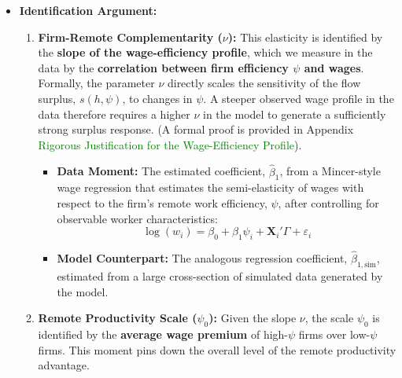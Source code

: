 \documentclass[
  11pt,
  letterpaper,
  DIV=11,
  numbers=noendperiod]{scrartcl}
\providecommand{\tightlist}{%
  \setlength{\itemsep}{0pt}\setlength{\parskip}{0pt}}\usepackage{longtable,booktabs,array}
\begin{document}
\begin{itemize}
\item
  \textbf{Identification Argument:}

  \begin{enumerate}
  \def\labelenumi{\arabic{enumi}.}
  \tightlist
  \item
    \textbf{Firm-Remote Complementarity (\(\nu\)):} This elasticity is
    identified by the \textbf{slope of the wage-efficiency profile},
    which we measure in the data by the \textbf{correlation between firm
    efficiency \(\psi\) and wages}. Formally, the parameter \(\nu\)
    directly scales the sensitivity of the flow surplus, \(s(h, \psi)\),
    to changes in \(\psi\). A steeper observed wage profile in the data
    therefore requires a higher \(\nu\) in the model to generate a
    sufficiently strong surplus response. (A formal proof is provided in
    Appendix
    \textcolor{green}{Rigorous Justification for the Wage-Efficiency Profile}).

    \begin{itemize}
    \tightlist
    \item
      \textbf{Data Moment:} The estimated coefficient,
      \(\hat{\beta}_1\), from a Mincer-style wage regression that
      estimates the semi-elasticity of wages with respect to the firm's
      remote work efficiency, \(\psi\), after controlling for observable
      worker characteristics:
      \[\log(w_i) = \beta_0 + \beta_1 \psi_{i} + \mathbf{X}_i'\Gamma + \varepsilon_i\]
    \item
      \textbf{Model Counterpart:} The analogous regression coefficient,
      \(\hat{\beta}_{1, \text{sim}}\), estimated from a large
      cross-section of simulated data generated by the model.
    \end{itemize}
  \item
    \textbf{Remote Productivity Scale (\(\psi_{0}\)):} Given the slope
    \(\nu\), the scale \(\psi_{0}\) is identified by the \textbf{average
    wage premium} of high-\(\psi\) firms over low-\(\psi\) firms. This
    moment pins down the overall level of the remote productivity
    advantage.


\end{enumerate}
\end{itemize}
\end{document}
